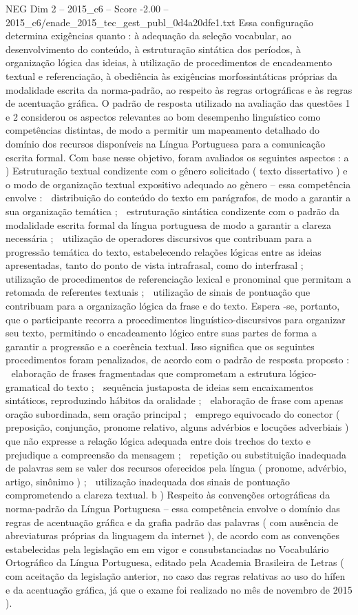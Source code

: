 \begin{textsample}{NEG Dim 2 – 2015\_c6 – Score -2.00 – 2015\_c6/enade\_2015\_tec\_gest\_publ\_0d4a20dfe1.txt}
Essa configuração determina exigências quanto : à adequação da seleção vocabular, ao desenvolvimento do conteúdo, à estruturação sintática dos períodos, à organização lógica das ideias, à utilização de procedimentos de encadeamento textual e referenciação, à obediência às exigências morfossintáticas próprias da modalidade escrita da norma-padrão, ao respeito às regras ortográficas e às regras de acentuação gráfica.
O padrão de resposta utilizado na avaliação das questões 1 e 2 considerou os aspectos relevantes ao bom desempenho linguístico como competências distintas, de modo a permitir um mapeamento detalhado do domínio dos recursos disponíveis na Língua Portuguesa para a comunicação escrita formal.
Com base nesse objetivo, foram avaliados os seguintes aspectos : a ) Estruturação textual condizente com o gênero solicitado ( texto dissertativo ) e o modo de organização textual expositivo adequado ao gênero – essa competência envolve :  distribuição do conteúdo do texto em parágrafos, de modo a garantir a sua organização temática ;  estruturação sintática condizente com o padrão da modalidade escrita formal da língua portuguesa de modo a garantir a clareza necessária ;  utilização de operadores discursivos que contribuam para a progressão temática do texto, estabelecendo relações lógicas entre as ideias apresentadas, tanto do ponto de vista intrafrasal, como do interfrasal ;  utilização de procedimentos de referenciação lexical e pronominal que permitam a retomada de referentes textuais ;  utilização de sinais de pontuação que contribuam para a organização lógica da frase e do texto.
Espera -se, portanto, que o participante recorra a procedimentos linguístico-discursivos para organizar seu texto, permitindo o encadeamento lógico entre suas partes de forma a garantir a progressão e a coerência textual.
Isso significa que os seguintes procedimentos foram penalizados, de acordo com o padrão de resposta proposto :  elaboração de frases fragmentadas que comprometam a estrutura lógico-gramatical do texto ;  sequência justaposta de ideias sem encaixamentos sintáticos, reproduzindo hábitos da oralidade ;  elaboração de frase com apenas oração subordinada, sem oração principal ;  emprego equivocado do conector ( preposição, conjunção, pronome relativo, alguns advérbios e locuções adverbiais ) que não expresse a relação lógica adequada entre dois trechos do texto e prejudique a compreensão da mensagem ;  repetição ou substituição inadequada de palavras sem se valer dos recursos oferecidos pela língua ( pronome, advérbio, artigo, sinônimo ) ;  utilização inadequada dos sinais de pontuação comprometendo a clareza textual. b ) Respeito às convenções ortográficas da norma-padrão da Língua Portuguesa – essa competência envolve o domínio das regras de acentuação gráfica e da grafia padrão das palavras ( com ausência de abreviaturas próprias da linguagem da internet ), de acordo com as convenções estabelecidas pela legislação em em vigor e consubstanciadas no Vocabulário Ortográfico da Língua Portuguesa, editado pela Academia Brasileira de Letras ( com aceitação da legislação anterior, no caso das regras relativas ao uso do hífen e da acentuação gráfica, já que o exame foi realizado no mês de novembro de 2015 ).

\end{textsample}
